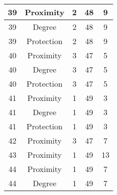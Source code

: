 \documentclass[results.tex]{subfiles}
\begin{document}
\begin{center}
\begin{tabular}{| c || c | c | c | c |}
            \hline
            39                      & Proximity                    & 2                      & 48                      & 9                    \\
            \hline
            39                      & Degree                       & 2                      & 48                      & 9                    \\
            \hline
            39                      & Protection                   & 2                      & 48                      & 9                    \\
            \hline
            40                      & Proximity                    & 3                      & 47                      & 5                    \\
            \hline
            40                      & Degree                       & 3                      & 47                      & 5                    \\
            \hline
            40                      & Protection                   & 3                      & 47                      & 5                    \\
            \hline
            41                      & Proximity                    & 1                      & 49                      & 3                    \\
            \hline
            41                      & Degree                       & 1                      & 49                      & 3                    \\
            \hline
            41                      & Protection                   & 1                      & 49                      & 3                    \\
            \hline
            42                      & Proximity                    & 3                      & 47                      & 7                    \\
            \hline
            43                      & Proximity                    & 1                      & 49                      & 13                   \\
            \hline
            44                      & Proximity                    & 1                      & 49                      & 7                    \\
            \hline
            44                      & Degree                       & 1                      & 49                      & 7                    \\

\end{tabular}
\end{center}
\end{document}
